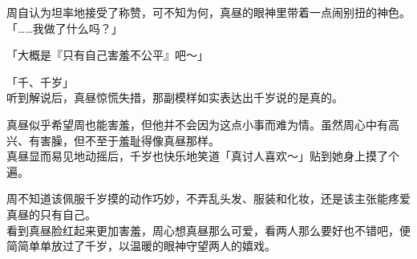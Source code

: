 周自认为坦率地接受了称赞，可不知为何，真昼的眼神里带着一点闹别扭的神色。\\

「……我做了什么吗？」

「大概是『只有自己害羞不公平』吧～」

「千、千岁」\\

听到解说后，真昼惊慌失措，那副模样如实表达出千岁说的是真的。

真昼似乎希望周也能害羞，但他并不会因为这点小事而难为情。虽然周心中有高兴、有害臊，但不至于羞耻得像真昼那样。\\

真昼显而易见地动摇后，千岁也快乐地笑道「真讨人喜欢～」贴到她身上摸了个遍。

周不知道该佩服千岁摸的动作巧妙，不弄乱头发、服装和化妆，还是该主张能疼爱真昼的只有自己。\\

看到真昼脸红起来更加害羞，周心想真昼那么可爱，看两人那么要好也不错吧，便简简单单放过了千岁，以温暖的眼神守望两人的嬉戏。
